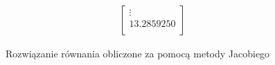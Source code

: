\documentclass[11pt]{extarticle}
\begin{document}
\begin{figure}[H]
\begin{align}
\begin{bmatrix}
				\vdots \\
				13.2859250 \\ 
			\end{bmatrix}
		\end{align}
		\caption{Rozwiązanie równania obliczone za pomocą metody Jacobiego}
	\end{figure}
\end{document}
